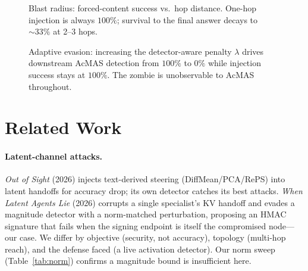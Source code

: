 \documentclass{article}
\begin{document}
\begin{figure}[h]
\centering
{}
\caption{Blast radius: forced-content success vs.\ hop distance. One-hop injection is always $100\%$; survival to the final answer decays to $\sim\!33\%$ at 2--3 hops.}
\label{fig:reach}
\end{figure}

\begin{figure}[h]
\centering
{}
\caption{Adaptive evasion: increasing the detector-aware penalty $\lambda$ drives downstream AcMAS detection from $100\%$ to $0\%$ while injection success stays at $100\%$. The zombie is unobservable to AcMAS throughout.}
\label{fig:stealth}
\end{figure}

\section{Related Work}
\paragraph{Latent-channel attacks.} \emph{Out of Sight} (2026) injects text-derived steering (DiffMean/PCA/RePS) into latent handoffs for accuracy drop; its own detector catches its best attacks. \emph{When Latent Agents Lie} (2026) corrupts a single specialist's KV handoff and evades a magnitude detector with a norm-matched perturbation, proposing an HMAC signature that fails when the signing endpoint is itself the compromised node---our case. We differ by objective (security, not accuracy), topology (multi-hop reach), and the defense faced (a live activation detector). Our norm sweep (Table~\ref{tab:norm}) confirms a magnitude bound is insufficient here.
\end{document}
